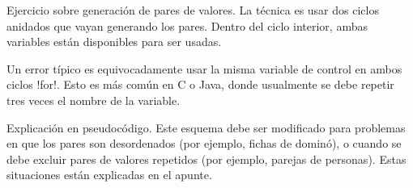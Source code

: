 \documentclass[10pt]{article}
\begin{document}

  Ejercicio sobre generación de pares de valores.
  La técnica es usar dos ciclos anidados
  que vayan generando los pares.
  Dentro del ciclo interior,
  ambas variables están disponibles para ser usadas.

  Un error típico es equivocadamente usar la misma variable de control en ambos ciclos \li!for!.
  Esto es más común en C o Java,
  donde usualmente se debe repetir tres veces el nombre de la variable.


  Explicación en pseudocódigo.
  Este esquema debe ser modificado
  para problemas en que los pares son desordenados (por ejemplo, fichas de dominó),
  o cuando se debe excluir pares de valores repetidos (por ejemplo, parejas de personas).
  Estas situaciones están explicadas en el apunte.
\end{document}
